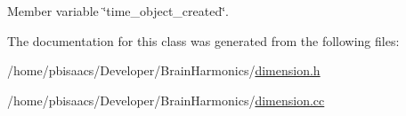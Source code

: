 Member variable \char`\"{}time\+\_\+object\+\_\+created\char`\"{}. 



The documentation for this class was generated from the following files\+:\begin{DoxyCompactItemize}
\item 
/home/pbisaacs/\+Developer/\+Brain\+Harmonics/\mbox{\hyperlink{dimension_8h}{dimension.\+h}}\item 
/home/pbisaacs/\+Developer/\+Brain\+Harmonics/\mbox{\hyperlink{dimension_8cc}{dimension.\+cc}}\end{DoxyCompactItemize}
